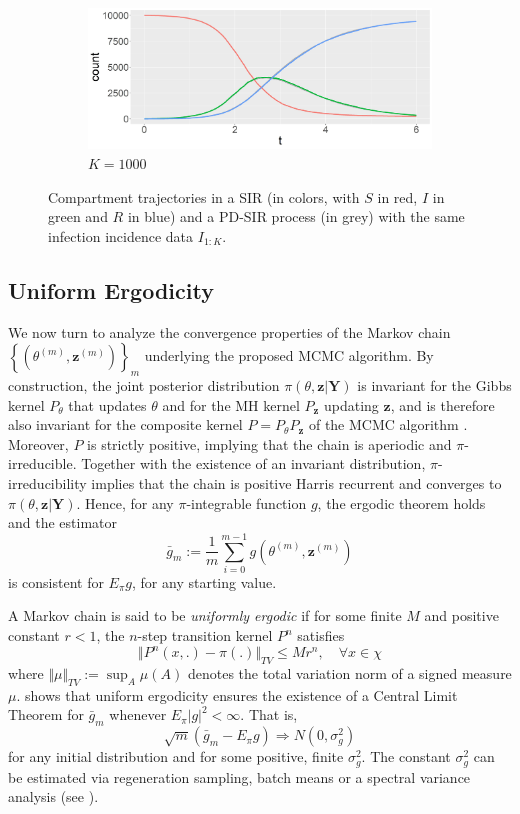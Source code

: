 \documentclass[12pt]{article}
\begin{document}
\begin{figure}
\begin{center}
\begin{subfigure}[b]{0.49\textwidth}
			\centering
			\includegraphics[width=\textwidth]{E2_K1000}
			\caption{$K = 1000$}
			\label{fig:comparison_RD_SIR_K1000}
		\end{subfigure}
	\end{center}
	\caption{Compartment trajectories in a SIR (in colors, with $S$ in red, $I$ in green and $R$ in blue) and a PD-SIR process (in grey) with the same infection incidence data $I_{1:K}$. \label{fig:comparison}}
\end{figure}

\subsection{Uniform Ergodicity}
\label{sec:uni}
We now turn to analyze the convergence properties of the Markov chain $\left\{\left(\theta^{(m)}, \mathbf{z}^{(m)}\right)\right\}_m$ underlying the proposed MCMC algorithm. By construction, the joint posterior distribution $\pi(\theta, \mathbf{z}|\mathbf{Y})$ is invariant for the Gibbs kernel $P_\theta$ that updates $\theta$ and for the MH kernel $P_\mathbf{z}$ updating $\mathbf{z}$, and is therefore also invariant for the composite kernel $P=P_\theta P_\mathbf{z}$ of the MCMC algorithm \citep{Tierney.1994}. Moreover, $P$ is strictly positive, implying that the chain is aperiodic and $\pi$-irreducible. Together with the existence of an invariant distribution, $\pi$-irreducibility implies that the chain is positive Harris recurrent and converges to $\pi(\theta, \mathbf{z}|\mathbf{Y})$. Hence, for any $\pi$-integrable function $g$, the ergodic theorem holds and the estimator
$$\bar{g}_m := \frac{1}{m} \sum_{i=0}^{m-1} g\left(\theta^{(m)}, \mathbf{z}^{(m)}\right)$$
is consistent for $E_\pi g$, for any starting value. 

A Markov chain is said to be \textit{uniformly ergodic} if for some finite $M$ and positive constant $r<1$, the $n$-step transition kernel $P^n$ satisfies
$$
\Vert P^n(x,.)-\pi(.)\Vert_{TV} \le M r^n, \quad \forall x \in \chi
$$
where $\Vert \mu \Vert_{TV} := \sup_A \mu(A)$ denotes the total variation norm of a signed measure $\mu$.
\cite{Jones.2004b} shows that uniform ergodicity ensures the existence of a Central Limit Theorem for $\bar{g}_m$ whenever $E_\pi |g|^2 < \infty$. That is,
$$\sqrt{m}(\bar{g}_m - E_\pi g) \Rightarrow N(0, \sigma^2_g)$$
for any initial distribution and for some positive, finite $\sigma^2_g$. The constant $\sigma^2_g$ can be estimated via regeneration sampling, batch means or a spectral variance analysis (see \cite{Flegal.2010}).
\end{document}
